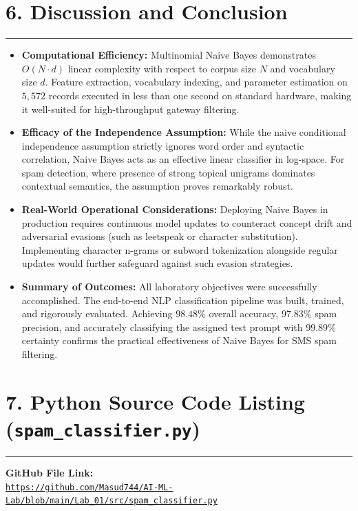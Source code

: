 \documentclass[11pt,a4paper]{article}
\begin{document}
\vspace{0.25cm}
\section*{6. Discussion and Conclusion}
\noindent\rule{\textwidth}{0.5pt}\vspace{0.12cm}

\begin{itemize}
    \setlength{\itemsep}{3pt}
    \item \textbf{Computational Efficiency:} Multinomial Naive Bayes demonstrates $O(N \cdot d)$ linear complexity with respect to corpus size $N$ and vocabulary size $d$. Feature extraction, vocabulary indexing, and parameter estimation on $5,572$ records executed in less than one second on standard hardware, making it well-suited for high-throughput gateway filtering.
    \item \textbf{Efficacy of the Independence Assumption:} While the naive conditional independence assumption strictly ignores word order and syntactic correlation, Naive Bayes acts as an effective linear classifier in log-space. For spam detection, where presence of strong topical unigrams dominates contextual semantics, the assumption proves remarkably robust.
    \item \textbf{Real-World Operational Considerations:} Deploying Naive Bayes in production requires continuous model updates to counteract concept drift and adversarial evasions (such as leetspeak or character substitution). Implementing character n-grams or subword tokenization alongside regular updates would further safeguard against such evasion strategies.
    \item \textbf{Summary of Outcomes:} All laboratory objectives were successfully accomplished. The end-to-end NLP classification pipeline was built, trained, and rigorously evaluated. Achieving $98.48\%$ overall accuracy, $97.83\%$ spam precision, and accurately classifying the assigned test prompt with $99.89\%$ certainty confirms the practical effectiveness of Naive Bayes for SMS spam filtering.
\end{itemize}

\newpage

\section*{7. Python Source Code Listing (\texttt{spam\_classifier.py})}
\noindent\rule{\textwidth}{0.5pt}\vspace{0.2cm}

\noindent\textbf{GitHub File Link:}\\
\href{https://github.com/Masud744/AI-ML-Lab/blob/main/Lab_01/src/spam_classifier.py}{\texttt{https://github.com/Masud744/AI-ML-Lab/blob/main/Lab\_01/src/spam\_classifier.py}}\vspace{0.25cm}


\end{document}
